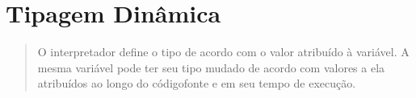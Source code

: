 \documentclass[letterpaper,10pt,brazil]{sphinxmanual}
\begin{document}
\begin{sphinxVerbatim}[commandchars=\\\{\}]
\end{sphinxVerbatim}

\begin{sphinxVerbatim}[commandchars=\\\{\}]
 
      

 
      

 
      

  
\end{sphinxVerbatim}


\section{Tipagem Dinâmica}
\label{\detokenize{content/language_particularities:tipagem-dinamica}}\begin{quote}

O interpretador define o tipo de acordo com o valor atribuído à variável.
A mesma variável pode ter seu tipo mudado de acordo com valores a ela atribuídos ao longo do código\sphinxhyphen{}fonte e em seu tempo de execução.
\end{quote}

\begin{sphinxVerbatim}[commandchars=\\\{\}]
  
\end{sphinxVerbatim}

\begin{sphinxVerbatim}[commandchars=\\\{\}]
\end{sphinxVerbatim}

\begin{sphinxVerbatim}[commandchars=\\\{\}]
  
\end{sphinxVerbatim}
\end{document}
